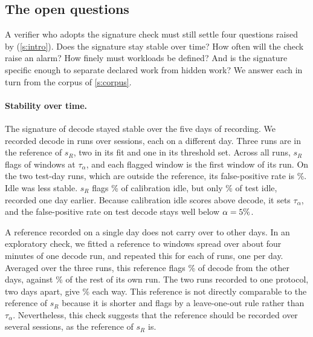 \subsection{The open questions}\label{s:declaration}

A verifier who adopts the signature check must still settle four questions
raised by \citet{scher2025} (\cref{s:intro}). Does the signature stay stable
over time? How often will the check raise an alarm? How finely must workloads
be defined? And is the signature specific enough to separate declared work from
hidden work? We answer each in turn from the corpus of \cref{s:corpus}.

\paragraph{Stability over time.} The signature of decode stayed stable over the five days of recording. We recorded
decode in \DecodeRuns{} runs over \DecodeSessions{} sessions, each on a different day.
Three runs are in the reference of $s_R$, two in its fit and one in its threshold set.
Across all \DecodeRuns{} runs, $s_R$ flags
\DecodeFlagged{} of \DecodeWindows{} windows at $\tau_\alpha$, and each flagged window
is the first window of its run. On the two test-day runs, which are outside the reference, its false-positive rate is
\FprRoneDecode\%. Idle was less stable. $s_R$ flags \RoneCalIdle\% of calibration
idle, but only \FprRoneIdle\% of test idle, recorded one day earlier. Because
calibration idle scores above decode, it sets $\tau_\alpha$, and the false-positive rate on test
decode stays well below $\alpha = 5\%$.

A reference recorded on a single day does not carry over to other days. In an exploratory check, we
fitted a reference to \SessRefWindows{} windows spread over about four minutes of one
decode run, and repeated this for each of \SessRuns{} runs, one per day. Averaged over
the three runs, this reference flags \SessOther\% of decode from the other days,
against \SessSame\% of the rest of its own run. The two runs recorded to one protocol,
two days apart, give \SessPair\% each way. This reference is not directly comparable to the reference of $s_R$ because it is shorter and flags by a leave-one-out rule rather than $\tau_\alpha$. Nevertheless, this check suggests that the reference should be recorded over several sessions, as the reference of $s_R$ is.

